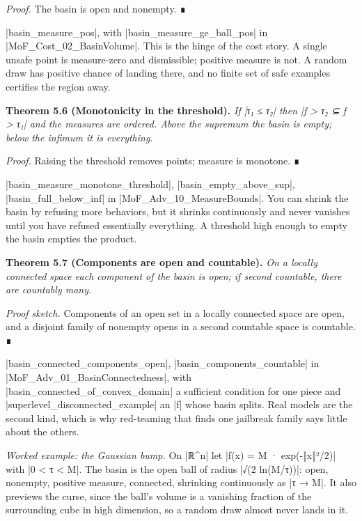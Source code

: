 \documentclass{memoir}
\begin{document}
\emph{Proof.} The basin is open and nonempty. ∎

\LeanVerb|basin_measure_pos|, with \LeanVerb|basin_measure_ge_ball_pos| in
\LeanVerb|MoF_Cost_02_BasinVolume|. This is the hinge of the cost story. A single unsafe
point is measure-zero and dismissible; positive measure is not. A random draw
has positive chance of landing there, and no finite set of safe examples
certifies the region away.

\textbf{Theorem 5.6 (Monotonicity in the threshold).} \emph{If \LeanVerb|τ₁ ≤ τ₂| then \LeanVerb|f > τ₂ ⊆ f > τ₁|
and the measures are ordered. Above the supremum the basin is empty; below the
infimum it is everything.}

\emph{Proof.} Raising the threshold removes points; measure is monotone. ∎

\LeanVerb|basin_measure_monotone_threshold|, \LeanVerb|basin_empty_above_sup|,
\LeanVerb|basin_full_below_inf| in \LeanVerb|MoF_Adv_10_MeasureBounds|. You can shrink the basin
by refusing more behaviors, but it shrinks continuously and never vanishes until
you have refused essentially everything. A threshold high enough to empty the
basin empties the product.

\textbf{Theorem 5.7 (Components are open and countable).} \emph{On a locally connected space each
component of the basin is open; if second countable, there are countably many.}

\emph{Proof sketch.} Components of an open set in a locally connected space are open, and a
disjoint family of nonempty opens in a second countable space is countable. ∎

\LeanVerb|basin_connected_components_open|, \LeanVerb|basin_components_countable| in
\LeanVerb|MoF_Adv_01_BasinConnectedness|, with \LeanVerb|basin_connected_of_convex_domain| a
sufficient condition for one piece and \LeanVerb|superlevel_disconnected_example| an \LeanVerb|f|
whose basin splits. Real models are the second kind, which is why red-teaming
that finds one jailbreak family says little about the others.

\emph{Worked example: the Gaussian bump.} On \LeanVerb|ℝ^n| let \LeanVerb|f(x) = M · exp(-‖x‖²/2)| with
\LeanVerb|0 < τ < M|. The basin is the open ball of radius \LeanVerb|√(2 ln(M/τ))|: open,
nonempty, positive measure, connected, shrinking continuously as \LeanVerb|τ → M|. It
also previews the curse, since the ball's volume is a vanishing fraction of the
surrounding cube in high dimension, so a random draw almost never lands in it.
\end{document}
